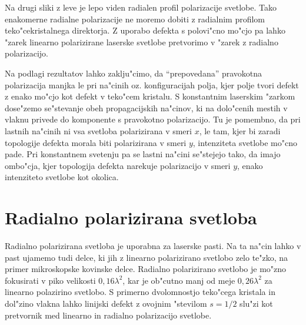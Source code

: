 \documentclass[12pt,twoside,openright,final]{report}
\begin{document}
Na drugi sliki z leve je lepo viden radialen profil polarizacije svetlobe. 
Tako enakomerne radialne polarizacije ne moremo dobiti z radialnim profilom teko"cekristalnega direktorja. 
Z uporabo defekta s polovi"cno mo"cjo pa lahko "zarek linearno polarizirane laserske svetlobe pretvorimo v "zarek z radialno polarizacijo. 

Na podlagi rezultatov lahko zaklju"cimo, da ``prepovedana'' pravokotna polarizacija manjka le pri na"cinih oz. konfiguracijah polja, kjer polje tvori defekt z enako mo"cjo kot defekt v teko"cem kristalu. 
S konstantnim laserskim "zarkom dose"zemo se"stevanje obeh propagacijskih na"cinov, ki na dolo"cenih mestih v vlaknu privede do komponente s pravokotno polarizacijo. 
Tu je pomembno, da pri lastnih na"cinih ni vsa svetloba polarizirana v smeri $x$, le tam, kjer bi zaradi topologije defekta morala biti polarizirana v smeri $y$, intenziteta svetlobe mo"cno pade. 
Pri konstantnem svetenju pa se lastni na"cini se"stejejo tako, da imajo ombo"cja, kjer topologija defekta narekuje polarizacijo v smeri $y$, enako intenziteto svetlobe kot okolica. 

\section{Radialno polarizirana svetloba}
Radialno polarizirana svetloba je uporabna za laserske pasti. 
Na ta na"cin lahko v past ujamemo tudi delce, ki jih z linearno polarizirano svetlobo zelo te"zko, na primer mikroskopske kovinske delce\cite{radial-trap}.
Radialno polarizirano svetlobo je mo"zno fokusirati v piko velikosti $0,\!16\lambda^2$, kar je ob"cutno manj od meje $0,\!26\lambda^2$ za linearno polazirino svetlobo\cite{radial-focus}. 
S primerno dvolomnostjo teko"cega kristala in dol"zino vlakna lahko linijski defekt z ovojnim "stevilom $s=1/2$ slu"zi kot pretvornik med linearno in radialno polarizacijo svetlobe. 
\end{document}
